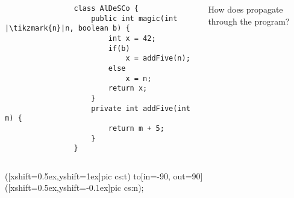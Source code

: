 \documentclass[aspectratio=169, usepdftitle=false, xcolor={dvipsnames}]{beamer}
\begin{document}
\begin{frame}[fragile]
{}
	\begin{columns}[c]
		\begin{column}{0.55\textwidth}
			\begin{dottedborder}
			\begin{verbatim}
				class AlDeSCo {
					public int magic(int |\tikzmark{n}|n, boolean b) {
						int x = 42;
						if(b)
							x = addFive(n);
						else
							x = n;
						return x;
					}
					private int addFive(int m) {
						return m + 5;
					}
				}
			\end{verbatim}
			\end{dottedborder}
		\end{column}
		\begin{column}{0.35\textwidth}
			\block How does  propagate through the program?\endblock\bigskip
			\centerline{\clap{\scalebox{.85}{\smile@linewidth0.7px\usebox\steps}}}
		\end{column}
	\end{columns}
	 ([xshift=0.5ex,yshift=1ex]pic cs:t) to[in=-90, out=90] ([xshift=0.5ex,yshift=-0.1ex]pic cs:n);
\end{frame}
\end{document}
